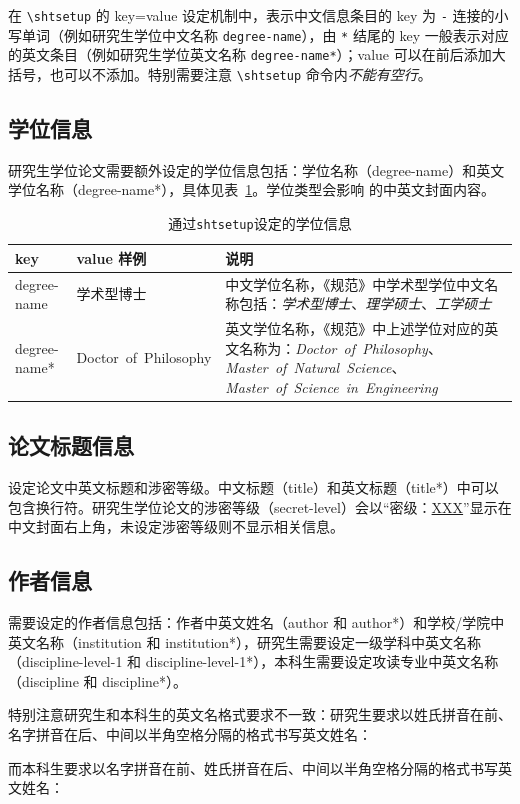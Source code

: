 \documentclass[bachelor, comfort]{shtthesis}
\begin{document}
在 \verb|\shtsetup| 的 key=value 设定机制中，表示中文信息条目的 key 为 \verb|-| 连接的小写单词（例如研究生学位中文名称 \verb|degree-name|），由 \verb|*| 结尾的 key 一般表示对应的英文条目（例如研究生学位英文名称 \verb|degree-name*|）；value 可以在前后添加大括号，也可以不添加。特别需要注意 \verb|\shtsetup| 命令内\emph{不能有空行}。

\subsection{学位信息}
研究生学位论文需要额外设定的学位信息包括：学位名称（degree-name）和英文学位名称（degree-name*），具体见表~\ref{tab::degree_info}。学位类型会影响 \shtthesis{} 的中英文封面内容。
\begin{table}[htb]
\centering
\caption{通过\texttt{shtsetup}设定的学位信息} \label{tab::degree_info}
\begin{tabular}{llp{}}
  \toprule
  key & value 样例 & 说明 \\
  \midrule
  degree-name & 学术型博士 & 中文学位名称，《规范》中学术型学位中文名称包括：\emph{学术型博士}、\emph{理学硕士}、\emph{工学硕士} \\
  degree-name* & Doctor~of~Philosophy & 英文学位名称，《规范》中上述学位对应的英文名称为：\emph{Doctor~of~Philosophy}、\emph{Master~of~Natural~Science}、\emph{Master~of~Science~in~Engineering} \\
  \bottomrule
\end{tabular}
\end{table}

\subsection{论文标题信息}
设定论文中英文标题和涉密等级。中文标题（title）和英文标题（title*）中可以包含换行符。研究生学位论文的涉密等级（secret-level）会以“密级：\uline{XXX}”显示在中文封面右上角，未设定涉密等级则不显示相关信息。

\subsection{作者信息}
需要设定的作者信息包括：作者中英文姓名（author 和 author*）和学校/学院中英文名称（institution 和 institution*），研究生需要设定一级学科中英文名称（discipline-level-1 和 discipline-level-1*），本科生需要设定攻读专业中英文名称（discipline 和 discipline*）。

特别注意研究生和本科生的英文名格式要求不一致：研究生要求以姓氏拼音在前、名字拼音在后、中间以半角空格分隔的格式书写英文姓名：
\begin{latex}
\end{latex}
而本科生要求以名字拼音在前、姓氏拼音在后、中间以半角空格分隔的格式书写英文姓名：
\begin{latex}
\end{latex}
\end{document}
